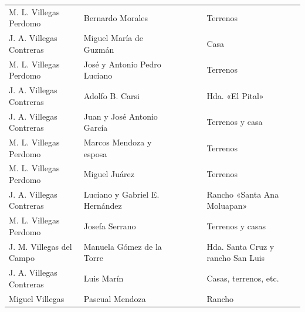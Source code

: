 \documentclass[14pt,twoside,final]{extbook} %
\begin{document}
{\begin{longtable}[c]{@{}p{2.5cm}lrSrrl@{}}
M. L. Villegas Perdomo & Bernardo Morales &  & {} & {} & {} & Terrenos \\
J. A. Villegas Contreras & Miguel María de Guzmán &  &  &  &  & Casa \\
M. L. Villegas Perdomo & José y Antonio Pedro Luciano &  & {} & {} & {} & Terrenos \\
J. A. Villegas Contreras & Adolfo B. Carsi &  &  &  &  & Hda. «El Pital» \\
J. A. Villegas Contreras & Juan y José Antonio García &  &  &  &  & Terrenos y casa \\
M. L. Villegas Perdomo & Marcos Mendoza y esposa &  &  & {} & {} & Terrenos \\
M. L. Villegas Perdomo & Miguel Juárez &  & {} & {} & {} & Terrenos \\
J. A. Villegas Contreras & Luciano y Gabriel E. Hernández &  &  &  &  & Rancho «Santa Ana Moluapan» \\
M. L. Villegas Perdomo & Josefa Serrano &  &  & {} & {} & Terrenos y casas \\
J. M. Villegas del Campo & Manuela Gómez de la Torre &  &  &  &  & Hda. Santa Cruz y rancho San Luis \\
J. A. Villegas Contreras & Luis Marín &  &  &  &  & Casas, terrenos, etc. \\
Miguel Villegas & Pascual Mendoza &  &  & {} & {} & Rancho \\

\end{longtable}}
\end{document}
